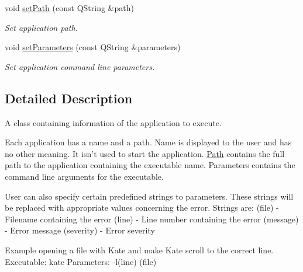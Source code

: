 \begin{DoxyCompactItemize}
void \hyperlink{class_application_a34c7e5c0c18a0e8f352d9c385c0b6de0}{set\-Path} (const Q\-String \&path)
\begin{DoxyCompactList}\small\item\em Set application path. \end{DoxyCompactList}\item 
void \hyperlink{class_application_a6cc41f74016e828b20ecb1cc889f1968}{set\-Parameters} (const Q\-String \&parameters)
\begin{DoxyCompactList}\small\item\em Set application command line parameters. \end{DoxyCompactList}\end{DoxyCompactItemize}


\subsection{Detailed Description}
A class containing information of the application to execute. 

Each application has a name and a path. Name is displayed to the user and has no other meaning. It isn't used to start the application. \hyperlink{class_path}{Path} contains the full path to the application containing the executable name. Parameters contains the command line arguments for the executable.

User can also specify certain predefined strings to parameters. These strings will be replaced with appropriate values concerning the error. Strings are\-: (file) -\/ Filename containing the error (line) -\/ Line number containing the error (message) -\/ Error message (severity) -\/ Error severity

Example opening a file with Kate and make Kate scroll to the correct line. Executable\-: kate Parameters\-: -\/l(line) (file) 

